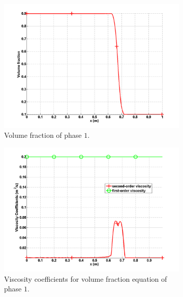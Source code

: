 \begin{figure}[H]
        \centering
        \begin{subfigure}[b]{0.495\textwidth}
                \centering
                \includegraphics[width=\textwidth]{figures/liquid_volume_fraction.png}
                \caption{Volume fraction of phase $1$.}
                \label{fig:vf-liq-7-eqn-sect4}
        \end{subfigure}%
        \begin{subfigure}[b]{0.495\textwidth}
                \centering
                \includegraphics[width=\textwidth]{figures/liquid_beta.png}
                \caption{Viscosity coefficients for volume fraction equation of phase $1$.}
                \label{fig:beta-liq-7-eqn-sect4}
        \end{subfigure}
        \caption{\label{fig:inlet_sct3}}
\end{figure}
